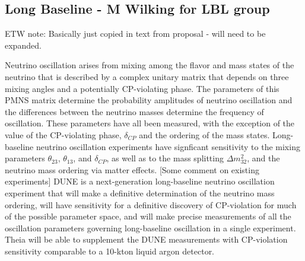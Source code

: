 \subsection{Long Baseline - M Wilking for LBL group}

ETW note: Basically just copied in text from proposal - will need to be expanded.

Neutrino oscillation arises from mixing among the flavor and mass states of the neutrino that is described
by a complex unitary matrix that depends on three mixing angles and a potentially CP-violating phase. The
parameters of this PMNS matrix determine the probability amplitudes of neutrino oscillation and the
differences between the neutrino masses determine the frequency of oscillation. These parameters have
all been measured, with the exception of the value of the CP-violating phase, $\delta_{CP}$ and the ordering
of the mass states. Long-baseline neutrino oscillation experiments have signficant sensitivity to the
mixing parameters $\theta_{23}$, $\theta_{13}$, and $\delta_{CP}$, as well as to the mass splitting
$\Delta m^{2}_{32}$, and the neutrino mass ordering via matter effects. [Some comment on existing experiments]
DUNE is a next-generation long-baseline neutrino oscillation experiment that will make a definitive
determination of the neutrino mass ordering, will have sensitivity for a definitive discovery of CP-violation
for much of the possible parameter space, and will make precise measurements of all the oscillation
parameters governing long-baseline oscillation in a single experiment.
Theia will be able to supplement the DUNE measurements with CP-violation sensitivity comparable to a
10-kton liquid argon detector.

